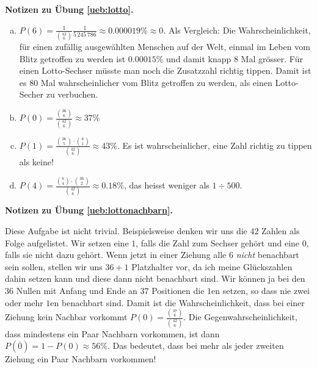 \documentclass[%
11pt,%
twoside,%
titlepage,%
german,%
headsepline%
]{scrartcl}
\newcounter{satzz}[section]\setcounter{satzz}{0}
\newcommand{\concatueb}[1]{ueb:#1}%
\newcommand{\concatlsg}[1]{lsg:#1}%
\newenvironment{lsg}[1]{%
    \par\noindent\textbf{Notizen zu Übung \ref{\concatueb{#1}}.}%
    \label{\concatlsg{#1}}
}{%
    \par%
}
\begin{document}
\begin{lsg}{lotto}
\begin{enumerate}[a)]
\item $P(6)=\frac{1}{\binom{42}{6}}\frac{1}{5\,245\,786}\approx0.000019\%\approx0$. Als Vergleich: Die Wahrscheinlichkeit, f\"ur einen zuf\"allig ausgew\"ahlten Menschen auf der Welt, einmal im Leben vom Blitz getroffen zu werden ist $0.00015\%$ und damit knapp $8$ Mal gr\"osser. F\"ur einen Lotto-Sechser m\"usste man noch die Zusatzzahl richtig tippen. Damit ist es $80$ Mal wahrscheinlicher vom Blitz getroffen zu werden, als einen Lotto-Secher zu verbuchen.
\item $P(0)=\frac{\binom{36}{6}}{\binom{42}{6}}\approx37\%$
\item $P(1)=\frac{\binom{36}{5}\cdot\binom{6}{1}}{\binom{42}{6}}\approx43\%$. Es ist wahrscheinlicher, eine Zahl richtig zu tippen als keine!
\item $P(4)=\frac{\binom{6}{4}\cdot\binom{36}{2}}{\binom{42}{6}}\approx0.18\%$, das heisst weniger als $1\div500$.
\end{enumerate}
\end{lsg}

\begin{lsg}{lottonachbarn}
Diese Aufgabe ist nicht trivial. Beispielsweise denken wir uns die $42$ Zahlen als Folge aufgelistet. Wir setzen eine $1$, falls die Zahl zum Sechser geh\"ort und eine $0$, falls sie nicht dazu geh\"ort. Wenn jetzt in einer Ziehung alle $6$ \emph{nicht} benachbart sein sollen, stellen wir uns $36+1$ Platzhalter vor, da ich meine Gl\"uckszahlen dahin setzen kann und diese dann nicht benachbart sind. Wir k\"onnen ja bei den $36$ Nullen mit Anfang und Ende an $37$ Positionen die $1$en setzen, so dass nie zwei oder mehr $1$en benachbart sind. Damit ist die Wahrscheinlichkeit, dass bei einer Ziehung kein Nachbar vorkommt $P(0)=\frac{\binom{37}{6}}{\binom{42}{6}}$. Die Gegenwahrscheinlichkeit, dass mindestens ein Paar Nachbarn vorkommen, ist dann $P(\overline{0})=1-P(0)\approx56\%$. Das bedeutet, dass bei mehr als jeder zweiten Ziehung ein Paar Nachbarn vorkommen!
\end{lsg}
\end{document}
